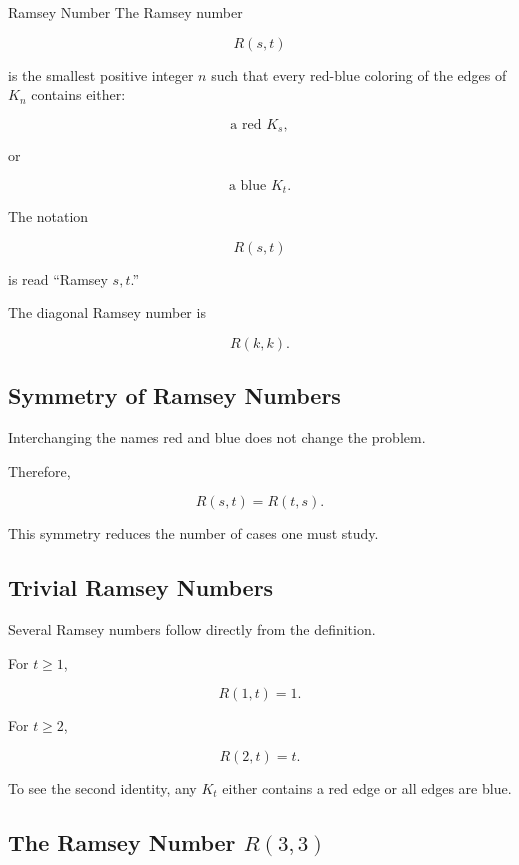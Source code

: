 \begin{definitionbox}{Ramsey Number}
The Ramsey number

\[
\boxed{
R(s,t)
}
\]

is the smallest positive integer \(n\) such that every red-blue coloring
of the edges of \(K_n\) contains either:

\[
\text{a red }K_s,
\]

or

\[
\text{a blue }K_t.
\]
\end{definitionbox}

The notation

\[
R(s,t)
\]

is read ``Ramsey \(s,t\).''

The diagonal Ramsey number is

\[
\boxed{
R(k,k).
}
\]

\subsection{Symmetry of Ramsey Numbers}
\label{subsec:ramsey-symmetry}

Interchanging the names red and blue does not change the problem.

Therefore,

\[
\boxed{
R(s,t)=R(t,s).
}
\]

This symmetry reduces the number of cases one must study.

\subsection{Trivial Ramsey Numbers}
\label{subsec:trivial-ramsey-numbers}

Several Ramsey numbers follow directly from the definition.

For \(t\geq1\),

\[
\boxed{
R(1,t)=1.
}
\]

For \(t\geq2\),

\[
\boxed{
R(2,t)=t.
}
\]

To see the second identity, any \(K_t\) either contains a red edge or
all edges are blue.

\subsection{The Ramsey Number \(R(3,3)\)}
\label{subsec:ramsey-33}

